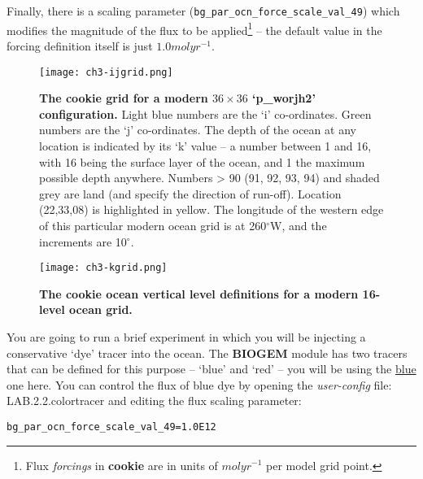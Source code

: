 Finally, there is a scaling parameter (\texttt{bg\_par\_ocn\_force\_scale\_val\_49}) which modifies the magnitude of the flux to be applied\footnote{Flux \textit{forcings} in \textbf{cookie} are in units of \(mol yr^{-1}\) per model grid point.} -- the default value in the forcing definition itself is just \(1.0 mol yr^{-1}\).

\newpage 

%
\begin{figure}
\texttt{[image: ch3-ijgrid.png]}\centering
\vspace{-0mm}
\caption{
\textbf{The  cookie grid for a modern \(36\times36\) ‘p\_worjh2’ configuration.} Light blue numbers are the ‘i’ co-ordinates. Green numbers are the ‘j’ co-ordinates.
The depth of the ocean at any location is indicated by its ‘k’ value – a number between 1 and 16, with 16 being the surface layer of the ocean, and 1 the maximum possible depth anywhere.
Numbers > 90 (91, 92, 93, 94) and shaded grey are land (and specify the direction of run-off).
Location (22,33,08) is highlighted in yellow.
The longitude of the western edge of this particular modern ocean grid is at 260$^{\circ}$W, and the increments are 10$^{\circ}$.
}
\label{fig:ch3-ijgrid}
\end{figure}

\begin{figure}
\texttt{[image: ch3-kgrid.png]}\centering
\vspace{-0mm}
\caption{\textbf{The cookie ocean vertical level definitions for a modern 16-level ocean grid.}}
\label{fig:ch3-kgrid}
\end{figure}

\noindent You are going to run a brief experiment in which you will be injecting a conservative ‘dye’ tracer into the ocean. The \textbf{BIOGEM} module has two tracers that can be defined for this purpose – ‘blue’ and ‘red’ -- you will be using the \uline{blue} one here. You can control the flux of blue dye by opening the \textit{user-config} file: \textsf{\footnotesize LAB.2.2.colortracer} and editing the flux scaling parameter:

\vspace{-2mm}\small\begin{verbatim}
bg_par_ocn_force_scale_val_49=1.0E12
\end{verbatim}\normalsize\vspace{-2mm}

